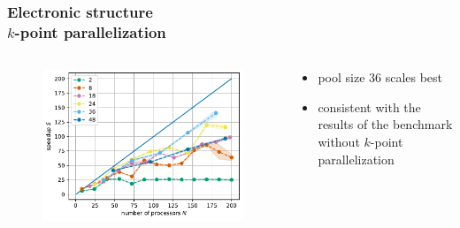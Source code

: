 \documentclass[aspectratio=169]{beamer}
\begin{document}
\begin{frame}
	\frametitle{Electronic structure\\ \(k\)-point parallelization}
	
	\begin{columns}
		\begin{column}{0.5\textwidth}
			\begin{figure}
				\includegraphics[width=\textwidth]{figs/TaS2_intel_bench_nk_speedup.pdf}
			\end{figure}
		\end{column}

		\begin{column}{0.5\textwidth}
			\begin{itemize}
				\item pool size 36 scales best
				\item consistent with the results of the benchmark without \(k\)-point parallelization
			\end{itemize}
		\end{column}
	\end{columns}

\end{frame}
\end{document}

